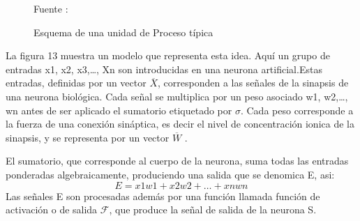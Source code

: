 \documentclass[a4paper, 12pt]{article}
\begin{document}
\begin{enumerate}
\begin{figure}[ht]
\begin{center}
\end{center}
\begin{center}
\caption{\small{Esquema de una unidad de Proceso típica}}
{\small{Fuente : \cite{Isasi}}}
\end{center}
\end{figure}
La figura 13 muestra un modelo que representa esta idea. Aquí un grupo de entradas x1, x2, x3,…, Xn son introducidas en una neurona artificial.Estas entradas, definidas por un vector $\overline{X}$, corresponden a las señales de la sinapsis de una neurona biológica. Cada señal se multiplica por un peso asociado w1, w2,…, wn antes de ser aplicado el sumatorio etiquetado por $ \sigma $. Cada peso corresponde a la fuerza de una conexión sináptica, es decir el nivel de concentración ionica de la sinapsis, y se representa por un vector $\overline{W}$ .\par
El sumatorio, que corresponde al cuerpo de la neurona, suma todas las entradas ponderadas algebraicamente, produciendo una salida que se denomica E, asi:
$$E= x1w1+x2w2+ … + xnwn$$
Las señales E son procesadas además por una función llamada función de activación o de salida $\mathcal{F}$, que produce la señal de salida de la neurona S.\par

\vskip 0.3cm



\end{enumerate}
\end{document}
